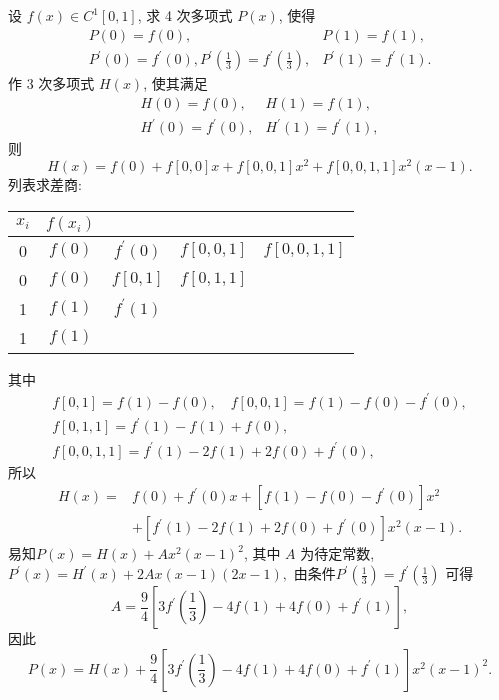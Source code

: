    \begin{tcolorbox}[enhanced,colback=10,colframe=9,breakable,coltitle=green!25!black,title=2024]
 设 $ f(x) \in C^{1}[0,1] $, 求 4 次多项式 $ P(x) $, 使得
$$
\begin{array}{ll}
P(0)=f(0), & P(1)=f(1), \\
P^{\prime}(0)=f^{\prime}(0), P^{\prime}\left(\frac{1}{3}\right)=f^{\prime}\left(\frac{1}{3}\right), & P^{\prime}(1)=f^{\prime}(1) .
\end{array}
$$
 \tcblower
作 3 次多项式 $ H(x) $, 使其满足
$$
\begin{array}{cc}
H(0)=f(0), & H(1)=f(1), \\
H^{\prime}(0)=f^{\prime}(0), & H^{\prime}(1)=f^{\prime}(1),
\end{array}
$$
则
$$
H(x)=f(0)+f[0,0] x+f[0,0,1] x^{2}+f[0,0,1,1] x^{2}(x-1) .
$$
列表求差商:
\begin{center}
\begin{tabular}{c|cccc}
\hline$ x_{i} $ & $ f\left(x_{i}\right) $ & & & \\
\hline 0 & $ f(0) $ & $ f^{\prime}(0) $ & $ f[0,0,1] $ & $ f[0,0,1,1] $ \\
0 & $ f(0) $ & $ f[0,1] $ & $ f[0,1,1] $ & \\
1 & $ f(1) $ & $ f^{\prime}(1) $ & & \\
1 & $ f(1) $ & & & \\
\hline
\end{tabular}
\end{center}

其中
$$
\begin{array}{c}
f[0,1]=f(1)-f(0), \quad f[0,0,1]=f(1)-f(0)-f^{\prime}(0), \\
f[0,1,1]=f^{\prime}(1)-f(1)+f(0), \\
f[0,0,1,1]=f^{\prime}(1)-2 f(1)+2 f(0)+f^{\prime}(0),
\end{array}
$$
所以
$$
\begin{aligned}
H(x)= & f(0)+f^{\prime}(0) x+\left[f(1)-f(0)-f^{\prime}(0)\right] x^{2} \\
& +\left[f^{\prime}(1)-2 f(1)+2 f(0)+f^{\prime}(0)\right] x^{2}(x-1) .
\end{aligned}
$$
易知$P(x)=H(x)+A x^{2}(x-1)^{2}$, 其中 $A$  为待定常数, $P^{\prime}(x)=H^{\prime}(x)+2 A x(x-1)(2 x-1),$ 由条件$P^{\prime}\left(\frac{1}{3}\right)=f^{\prime}\left(\frac{1}{3}\right)$ 可得
$$
A=\frac{9}{4}\left[3 f^{\prime}\left(\frac{1}{3}\right)-4 f(1)+4 f(0)+f^{\prime}(1)\right],
$$
因此
$$
P(x)=H(x)+\frac{9}{4}\left[3 f^{\prime}\left(\frac{1}{3}\right)-4 f(1)+4 f(0)+f^{\prime}(1)\right] x^{2}(x-1)^{2} .
$$

 \end{tcolorbox}

